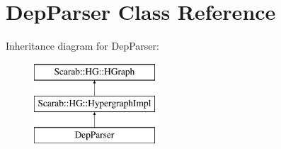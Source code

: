 \hypertarget{class_dep_parser}{
\section{DepParser Class Reference}
\label{class_dep_parser}
}
Inheritance diagram for DepParser:\begin{figure}[H]
\begin{center}
\leavevmode
\includegraphics[height=3cm]{class_dep_parser}
\end{center}
\end{figure}
